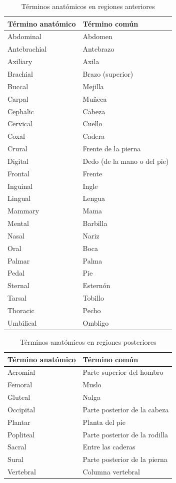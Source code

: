 \documentclass[12pt]{book}
\begin{document}
\begin{table}[htbp]
\centering
\caption{Términos anatómicos en regiones anteriores}
\label{tab:11}
\begin{tabularx}{0.7\textwidth}{XX}
\toprule
\textbf{Término anatómico} & \textbf{Término común} \\
\midrule
Abdominal & Abdomen \\
Antebrachial & Antebrazo \\
Axiliary & Axila \\
Brachial & Brazo (superior) \\
Buccal & Mejilla \\
Carpal & Muñeca \\
Cephalic & Cabeza \\
Cervical & Cuello \\
Coxal & Cadera \\
Crural & Frente de la pierna \\
Digital & Dedo (de la mano o del pie) \\
Frontal & Frente \\
Inguinal & Ingle \\
Lingual & Lengua \\
Mammary & Mama \\
Mental & Barbilla \\
Nasal & Nariz \\
Oral & Boca \\
Palmar & Palma \\
Pedal & Pie \\
Sternal & Esternón \\
Tarsal & Tobillo \\
Thoracic & Pecho \\
Umbilical & Ombligo \\
\bottomrule
\end{tabularx}
\end{table}

\begin{table}[htbp]
\centering
\caption{Términos anatómicos en regiones posteriores}
\label{tab:12}
\begin{tabularx}{0.7\textwidth}{XX}
\toprule
\textbf{Término anatómico} & \textbf{Término común} \\
\midrule
Acromial & Parte superior del hombro \\
Femoral & Muslo \\
Gluteal & Nalga \\
Occipital & Parte posterior de la cabeza \\
Plantar & Planta del pie \\
Popliteal & Parte posterior de la rodilla \\
Sacral & Entre las caderas \\
Sural & Parte posterior de la pierna \\
Vertebral & Columna vertebral \\
\bottomrule
\end{tabularx}
\end{table}
\end{document}
